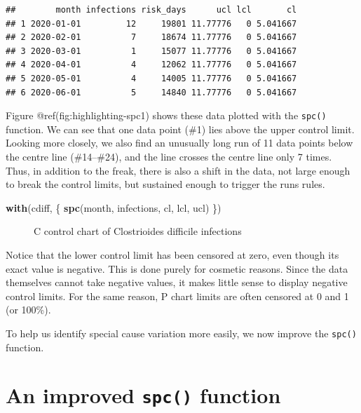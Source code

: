 \documentclass[
]{book}
\makeatletter
\newenvironment{Shaded}{\begin{snugshade}}{\end{snugshade}}
\newcommand{\FunctionTok}[1]{\textcolor[rgb]{0.13,0.29,0.53}{\textbf{#1}}}
\newcommand{\NormalTok}[1]{#1}
\newcommand*\pandocbounded[1]{%
  \sbox\pandoc@box{#1}%
  \Gscale@div\@tempa{\textheight}{\dimexpr\ht\pandoc@box+\dp\pandoc@box\relax}%
  \Gscale@div\@tempb{\linewidth}{\wd\pandoc@box}%
  \ifdim\@tempb\p@<\@tempa\p@\let\@tempa\@tempb\fi%
  \ifdim\@tempa\p@<\p@\scalebox{\@tempa}{\usebox\pandoc@box}%
  \else\usebox{\pandoc@box}%
  \fi%
}
\makeatother
\begin{document}
\begin{verbatim}
##        month infections risk_days      ucl lcl       cl
## 1 2020-01-01         12     19801 11.77776   0 5.041667
## 2 2020-02-01          7     18674 11.77776   0 5.041667
## 3 2020-03-01          1     15077 11.77776   0 5.041667
## 4 2020-04-01          4     12062 11.77776   0 5.041667
## 5 2020-05-01          4     14005 11.77776   0 5.041667
## 6 2020-06-01          5     14840 11.77776   0 5.041667
\end{verbatim}

Figure @ref(fig:highlighting-spc1) shows these data plotted with the
\texttt{spc()} function. We can see that one data point (\#1) lies above
the upper control limit. Looking more closely, we also find an unusually
long run of 11 data points below the centre line (\#14--\#24), and the
line crosses the centre line only 7 times. Thus, in addition to the
freak, there is also a shift in the data, not large enough to break the
control limits, but sustained enough to trigger the runs rules.

\begin{Shaded}
\begin{Highlighting}[]
\FunctionTok{with}\NormalTok{(cdiff, \{}
  \FunctionTok{spc}\NormalTok{(month, infections, cl, lcl, ucl)}
\NormalTok{\})}
\end{Highlighting}
\end{Shaded}

\begin{figure}
\centering
\pandocbounded{}
\caption{C control chart of Clostrioides difficile infections}
\end{figure}

Notice that the lower control limit has been censored at zero, even
though its exact value is negative. This is done purely for cosmetic
reasons. Since the data themselves cannot take negative values, it makes
little sense to display negative control limits. For the same reason, P
chart limits are often censored at 0 and 1 (or 100\%).

To help us identify special cause variation more easily, we now improve
the \texttt{spc()} function.

\section{\texorpdfstring{An improved \texttt{spc()}
function}{An improved spc() function}}\label{an-improved-spc-function}
\end{document}
